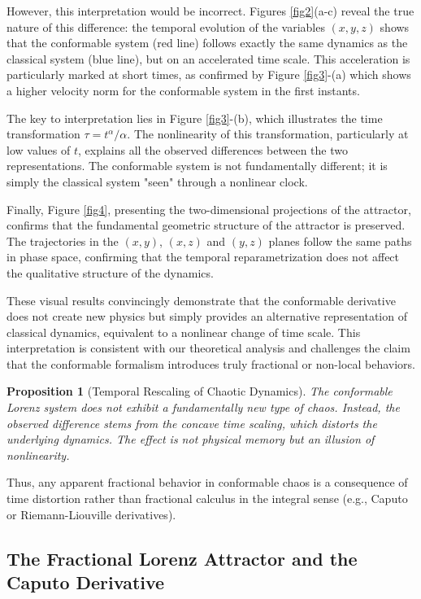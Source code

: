 \documentclass[preprint,12pt]{elsarticle}
\newtheorem{proposition}{Proposition}
\begin{document}
However, this interpretation would be incorrect. Figures \ref{fig2}(a-c) reveal the true nature of this difference: the temporal evolution of the variables $(x, y, z)$ shows that the conformable system (red line) follows exactly the same dynamics as the classical system (blue line), but on an accelerated time scale. This acceleration is particularly marked at short times, as confirmed by Figure \ref{fig3}-(a) which shows a higher velocity norm for the conformable system in the first instants.

The key to interpretation lies in Figure \ref{fig3}-(b), which illustrates the time transformation $\tau = t^\alpha/\alpha$. The nonlinearity of this transformation, particularly at low values of $t$, explains all the observed differences between the two representations. The conformable system is not fundamentally different; it is simply the classical system "seen" through a nonlinear clock.

Finally, Figure \ref{fig4}, presenting the two-dimensional projections of the attractor, confirms that the fundamental geometric structure of the attractor is preserved. The trajectories in the $(x,y)$, $(x,z)$ and $(y,z)$ planes follow the same paths in phase space, confirming that the temporal reparametrization does not affect the qualitative structure of the dynamics.

These visual results convincingly demonstrate that the conformable derivative does not create new physics but simply provides an alternative representation of classical dynamics, equivalent to a nonlinear change of time scale. This interpretation is consistent with our theoretical analysis and challenges the claim that the conformable formalism introduces truly fractional or non-local behaviors.

\begin{proposition}[Temporal Rescaling of Chaotic Dynamics] The conformable Lorenz system does not exhibit a fundamentally new type of chaos. Instead, the observed difference stems from the concave time scaling, which distorts the underlying dynamics. The effect is not physical memory but an illusion of nonlinearity.
\end{proposition}

Thus, any apparent fractional behavior in conformable chaos is a consequence of time distortion rather than fractional calculus in the integral sense (e.g., Caputo or Riemann-Liouville derivatives).

\subsection{The Fractional Lorenz Attractor and the Caputo Derivative}
\end{document}
